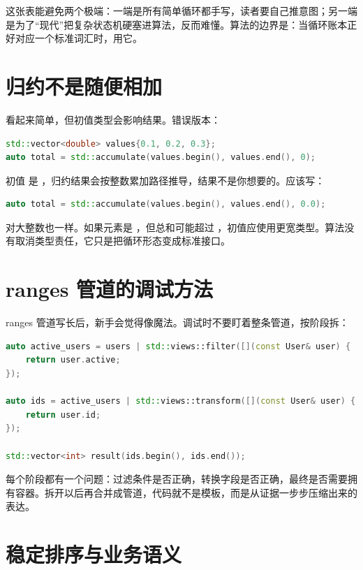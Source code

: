 这张表能避免两个极端：一端是所有简单循环都手写，读者要自己推意图；另一端是为了“现代”把复杂状态机硬塞进算法，反而难懂。算法的边界是：当循环账本正好对应一个标准词汇时，用它。

\section{归约不是随便相加}

 看起来简单，但初值类型会影响结果。错误版本：

\begin{lstlisting}[language=C++,caption={初值类型导致截断或溢出}]
std::vector<double> values{0.1, 0.2, 0.3};
auto total = std::accumulate(values.begin(), values.end(), 0);
\end{lstlisting}

初值  是 ，归约结果会按整数累加路径推导，结果不是你想要的。应该写：

\begin{lstlisting}[language=C++,caption={初值类型表达归约类型}]
auto total = std::accumulate(values.begin(), values.end(), 0.0);
\end{lstlisting}

对大整数也一样。如果元素是 ，但总和可能超过 ，初值应使用更宽类型。算法没有取消类型责任，它只是把循环形态变成标准接口。

\section{ranges 管道的调试方法}

ranges 管道写长后，新手会觉得像魔法。调试时不要盯着整条管道，按阶段拆：

\begin{lstlisting}[language=C++,caption={把管道拆成命名阶段}]
auto active_users = users | std::views::filter([](const User& user) {
    return user.active;
});

auto ids = active_users | std::views::transform([](const User& user) {
    return user.id;
});

std::vector<int> result(ids.begin(), ids.end());
\end{lstlisting}

每个阶段都有一个问题：过滤条件是否正确，转换字段是否正确，最终是否需要拥有容器。拆开以后再合并成管道，代码就不是模板，而是从证据一步步压缩出来的表达。

\section{稳定排序与业务语义}


